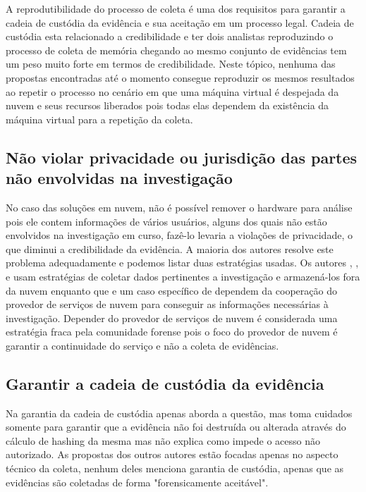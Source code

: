 \documentclass[conference]{IEEEtran}
\begin{document}
A reprodutibilidade do processo de coleta é uma dos requisitos para garantir a cadeia de custódia da evidência e sua aceitação em um processo legal. Cadeia de custódia esta relacionado a credibilidade e ter dois analistas reproduzindo o processo de coleta de memória chegando ao mesmo conjunto de evidências tem um peso muito forte em termos de credibilidade. 
%
Neste tópico, nenhuma das propostas encontradas até o momento consegue reproduzir os mesmos resultados ao repetir o processo no cenário em que uma máquina virtual é despejada da nuvem e seus recursos liberados pois todas elas dependem da existência da máquina virtual para a repetição da coleta. 

\subsection{Não violar privacidade ou jurisdição das partes não envolvidas na investigação}

No caso das soluções em nuvem, não é possível remover o hardware para análise pois ele contem informações de vários usuários, alguns dos quais não estão envolvidos na investigação em curso, fazê-lo levaria a violações de privacidade, o que diminui a credibilidade da evidência. 
%
A maioria dos autores resolve este problema adequadamente e podemos listar duas estratégias usadas. 
%
Os autores \cite{Reichert2015}, \cite{George2012}, \cite{Poisel2013} e \cite{Dykstra2013} usam estratégias de coletar dados pertinentes a investigação e armazená-los fora da nuvem enquanto que \cite{Sang2013} e um caso específico de \cite{George2012} dependem da cooperação do provedor de serviços de nuvem para conseguir as informações necessárias à investigação. 
%
Depender do provedor de serviços de nuvem é considerada uma estratégia fraca pela comunidade forense pois o foco do provedor de nuvem é garantir a continuidade do serviço e não a coleta de evidências.

\subsection{Garantir a cadeia de custódia da evidência}

Na garantia da cadeia de custódia apenas \cite{Sang2013} aborda a questão, mas toma cuidados somente para garantir que a evidência não foi destruída ou alterada através do cálculo de hashing da mesma mas não explica como impede o acesso não autorizado. 
%
As propostas dos outros autores estão focadas apenas no aspecto técnico da coleta, nenhum deles menciona garantia de custódia, apenas que as evidências são coletadas de forma "forensicamente aceitável".
\end{document}
